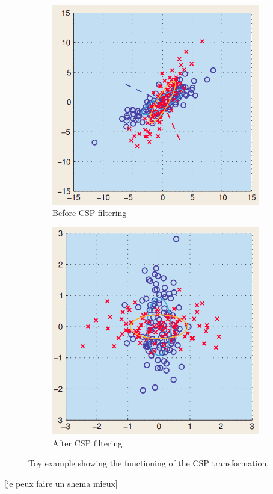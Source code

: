 \begin{figure}
    \centering
    \begin{subfigure}{.5\textwidth}
        \centering
        \includegraphics[width=1.\linewidth]{images_report/sensor/before_csp_filtering.png}
        \caption{Before CSP filtering}
        \label{fig:before_csp}
    \end{subfigure}%
    \begin{subfigure}{.5\textwidth}
        \centering
        \includegraphics[width=1.\linewidth]{images_report/sensor/after_csp_filtering.png}
        \caption{After CSP filtering}
        \label{fig:after_csp}
    \end{subfigure}
    \caption{Toy example showing the functioning of the CSP transformation.}
    \label{fig:csp_intuitive}
\end{figure}
[je peux faire un shema mieux]

